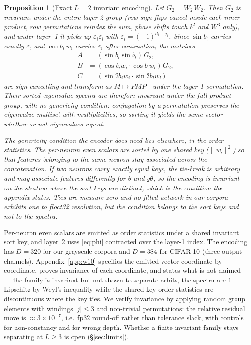 \documentclass[10pt,twocolumn,letterpaper]{article}
\newtheorem{proposition}[theorem]{Proposition}
\theoremstyle{definition}
\begin{document}
\begin{proposition}[Exact $L=2$ invariant encoding]\label{prop:deep}
Let $G_2 = W_2^\top W_2$. Then $G_2$ is invariant under the \emph{entire} layer-2 group (row sign
flips cancel inside each inner product, row permutations reindex the sum, phase shifts touch
$b^2$ and $W^3$ only), and under layer~1 it picks up $\varepsilon_i \varepsilon_l$ with
$\varepsilon_i = (-1)^{d_i + j_i}$. Since $\sin b_i$ carries exactly $\varepsilon_i$ and
$\cos b_i\, w_i$ carries $\varepsilon_i$ after contraction, the matrices
\begin{equation}
\begin{aligned}
A &= (\sin b_i \sin b_l)\,G_2,\\
B &= (\cos b_i w_i \!\cdot\! \cos b_l w_l)\,G_2,\\
C &= (\sin 2b_i w_i \!\cdot\! \sin 2b_l w_l)
\end{aligned}
\end{equation}
are sign-cancelling and transform as $M \mapsto P M P^\top$ under the layer-1 permutation. Their
sorted eigenvalue spectra are therefore invariant under the full product group, with no genericity
condition: conjugation by a permutation preserves the eigenvalue multiset with multiplicities, so
sorting it yields the same vector whether or not eigenvalues repeat.

The genericity condition the encoder does need lies elsewhere, in the \emph{order statistics}. The
per-neuron even scalars are sorted by one shared key ($\|w_i\|^2$) so that features belonging to
the same neuron stay associated across the concatenation. If two neurons carry exactly equal keys,
the tie-break is arbitrary and may associate features differently for $\theta$ and $g\theta$, so
the encoding is invariant on the stratum where the sort keys are distinct, which is the condition
the appendix states. Ties are measure-zero and no fitted network in our corpora exhibits one to
float32 resolution, but the condition belongs to the sort keys and not to the spectra.
\end{proposition}

Per-neuron even scalars are emitted as order statistics under a shared invariant sort key, and
layer~2 uses \eqref{eq:phi} contracted over the layer-1 index. The encoding has $D = 320$ for our
grayscale corpora and $D = 384$ for CIFAR-10 (three output channels).
Appendix~\ref{app:w10} specifies the emitted vector coordinate by coordinate, proves invariance of
each coordinate, and states what is not claimed --- the family is invariant but not shown to
separate orbits, the spectra are $1$-Lipschitz by Weyl's inequality while the shared-key order
statistics are discontinuous where the key ties. We verify invariance by
applying random group elements with windings $|j|\le3$ and non-trivial permutations: the relative
residual move is $\approx 3\times10^{-7}$, i.e.\ fp32 round-off rather than tolerance slack, with
controls for non-constancy and for wrong depth. Whether a finite invariant family stays separating
at $L \ge 3$ is open (\S\ref{sec:limits}).
\end{document}
